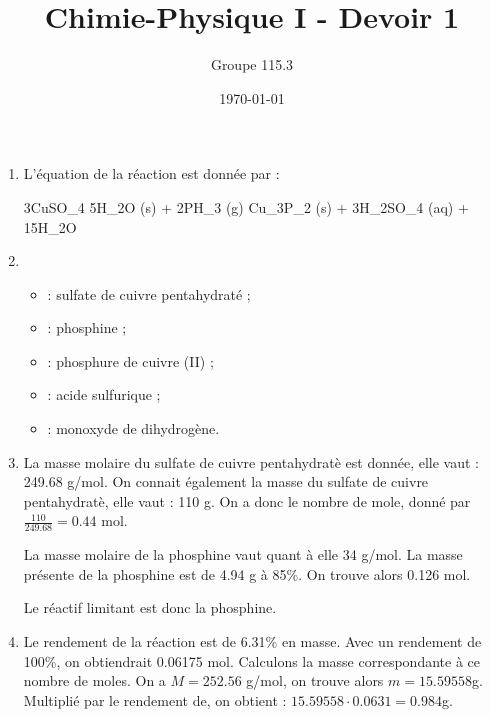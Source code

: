 \documentclass{article}
\title{Chimie-Physique I - Devoir 1}
\author{Groupe 115.3}
\date{\today}
\begin{document}
\maketitle

\begin{enumerate}
	\item 
		L'\'equation de la r\'eaction est donn\'ee par :
		\begin{chemmath}
			3CuSO_4 \cdot 5H_2O (s) + 2PH_3 (g) \longrightarrow Cu_3P_2 (s) + 3H_2SO_4 (aq) + 15H_2O
		\end{chemmath}
	\item 
		\begin{itemize}
			\item {} : sulfate de cuivre pentahydrat\'e ;
			\item {} : phosphine ;
			\item {} : phosphure de cuivre (II) ;
			\item {} : acide sulfurique ;
			\item {} : monoxyde de dihydrog\`ene.
		\end{itemize}
	\item
		La masse molaire du sulfate de cuivre pentahydrat\`e est donn\'ee, elle vaut : 249.68 g/mol. On connait 			\'egalement la masse du sulfate de cuivre pentahydrat\`e, elle vaut : 110 g. On a donc le nombre de mole, donn\'e par $\frac{110}{249.68} = 0.44$ mol.
		
		La masse molaire de la phosphine vaut quant \`a elle 34 g/mol. La masse pr\'esente de la phosphine est de 4.94 g \`a 85\%. On trouve alors 0.126 mol.
		
		Le r\'eactif limitant est donc la phosphine.
		
	\item
		Le rendement de la r\'eaction est de 6.31\% en masse. Avec un rendement de 100\%, on obtiendrait 0.06175 mol. Calculons la masse correspondante à ce nombre de moles. On a $M = 252.56$ g/mol, on trouve alors $m = 15.59558$g. Multipli\'e par le rendement de, on obtient : $15.59558 \cdot 0.0631 = 0.984$g.
\end{enumerate}
\end{document}

